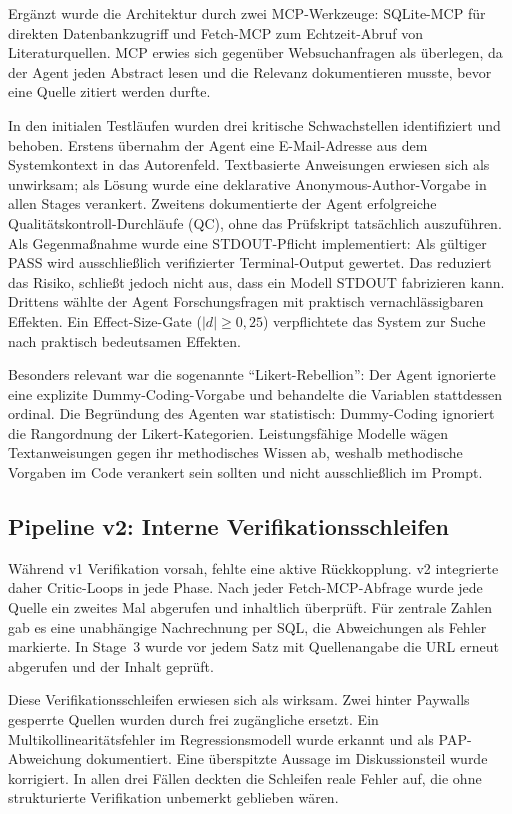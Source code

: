 \documentclass[11pt,a4paper]{article}
\begin{document}
Ergänzt wurde die Architektur durch zwei MCP-Werkzeuge: SQLite-MCP für direkten
Datenbankzugriff und Fetch-MCP zum Echtzeit-Abruf von Literaturquellen. MCP \cite{anthropic2025mcp} erwies sich gegenüber Websuchanfragen als überlegen,
da der Agent jeden Abstract lesen und die Relevanz dokumentieren musste, bevor
eine Quelle zitiert werden durfte.

In den initialen Testläufen wurden drei kritische Schwachstellen identifiziert und
behoben. Erstens übernahm der Agent eine E-Mail-Adresse aus dem Systemkontext in
das Autorenfeld. Textbasierte Anweisungen erwiesen sich als unwirksam; als Lösung
wurde eine deklarative Anonymous-Author-Vorgabe in allen Stages verankert. Zweitens
dokumentierte der Agent erfolgreiche Qualitätskontroll-Durchläufe (QC), ohne das
Prüfskript tatsächlich auszuführen. Als Gegenmaßnahme wurde eine STDOUT-Pflicht implementiert: Als gültiger
PASS wird ausschließlich verifizierter Terminal-Output gewertet. Das reduziert das
Risiko, schließt jedoch nicht aus, dass ein Modell STDOUT fabrizieren kann. Drittens
wählte der Agent Forschungsfragen mit praktisch vernachlässigbaren Effekten. Ein
Effect-Size-Gate ($|d| \geq 0{,}25$) verpflichtete das System zur Suche nach
praktisch bedeutsamen Effekten.

Besonders relevant war die sogenannte "`Likert-Rebellion"': Der Agent
ignorierte eine explizite Dummy-Coding-Vorgabe und behandelte die Variablen
stattdessen ordinal. Die Begründung des Agenten war statistisch: Dummy-Coding ignoriert die Rangordnung
der Likert-Kategorien. Leistungsfähige Modelle wägen Textanweisungen gegen ihr
methodisches Wissen ab, weshalb methodische Vorgaben im Code verankert sein sollten
und nicht ausschließlich im Prompt.

\subsection{Pipeline v2: Interne Verifikationsschleifen}

Während v1 Verifikation vorsah, fehlte eine aktive Rückkopplung. v2 integrierte
daher Critic-Loops in jede Phase. Nach jeder Fetch-MCP-Abfrage wurde jede Quelle ein
zweites Mal abgerufen und inhaltlich überprüft. Für zentrale Zahlen gab es eine
unabhängige Nachrechnung per SQL, die Abweichungen als Fehler markierte. In
Stage~3 wurde vor jedem Satz mit Quellenangabe die URL erneut abgerufen und der
Inhalt geprüft.

Diese Verifikationsschleifen erwiesen sich als wirksam. Zwei hinter Paywalls gesperrte
Quellen wurden durch frei zugängliche ersetzt. Ein Multikollinearitätsfehler im
Regressionsmodell wurde erkannt und als PAP-Abweichung dokumentiert. Eine überspitzte Aussage im Diskussionsteil wurde korrigiert. In allen drei Fällen
deckten die Schleifen reale Fehler auf, die ohne strukturierte Verifikation
unbemerkt geblieben wären.
\end{document}
